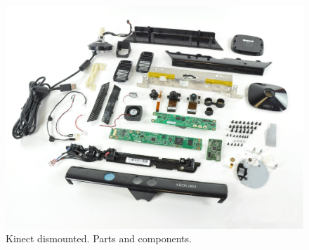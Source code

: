 		\begin{figure}[h]
			\begin{center}
			\includegraphics[scale=0.2]{img/kinect/kinect_parts.eps}
			\caption[Kinect Parts]{Kinect dismounted. Parts and components.}
			\end{center}

		\end{figure}


		